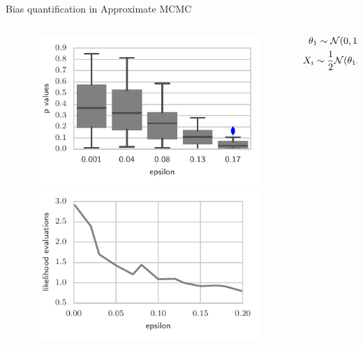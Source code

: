 \documentclass{beamer}
\begin{document}
  \begin{frame}{Bias quantification in Approximate MCMC}
\begin{columns}
        \begin{column}{.55\textwidth}
        \begin{figure}
           \includegraphics[width=\textwidth]{img/Heiko1} 
           
            \includegraphics[width=\textwidth]{img/Heiko2}
        \end{figure}
        \end{column}
        \begin{column}{.45\textwidth}
        \begin{align*}
\theta_{1}\sim{\cal N}(0,10);\theta_{2}\sim{\cal N}(0,1)\\
X_{i}\sim\frac{1}{2}{\cal N}(\theta_{1},4)+\frac{1}{2}{\cal N}(\theta_{2},4) & .
\end{align*}


\end{column}
\end{columns}
\end{frame}
\end{document}
